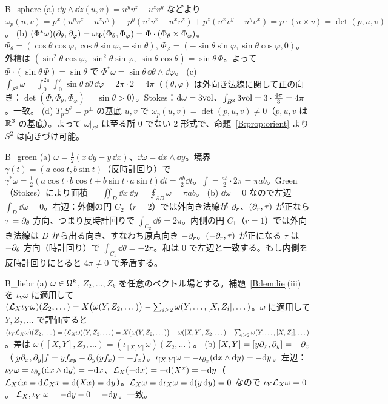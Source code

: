 \begin{soll}{B_sphere}
(a) $\dd y\wedge\dd z(u,v)=u^yv^z-u^zv^y$ などより $\omega_p(u,v)=p^x(u^yv^z-u^zv^y)+p^y(u^zv^x-u^xv^z)+p^z(u^xv^y-u^yv^x)=p\cdot(u\times v)=\det(p,u,v)$。
(b) $(\Phi^*\omega)(\partial_\theta,\partial_\varphi)=\omega_\Phi(\Phi_\theta,\Phi_\varphi)=\Phi\cdot(\Phi_\theta\times\Phi_\varphi)$。$\Phi_\theta=(\cos\theta\cos\varphi,\cos\theta\sin\varphi,-\sin\theta)$, $\Phi_\varphi=(-\sin\theta\sin\varphi,\sin\theta\cos\varphi,0)$。外積は $(\sin^2\theta\cos\varphi,\ \sin^2\theta\sin\varphi,\ \sin\theta\cos\theta)=\sin\theta\,\Phi$。よって $\Phi\cdot(\sin\theta\,\Phi)=\sin\theta$ で $\Phi^*\omega=\sin\theta\,\dd\theta\wedge\dd\varphi$。
(c) $\int_{S^2}\omega=\int_0^{2\pi}\!\!\int_0^\pi\sin\theta\,\dd\theta\,\dd\varphi=2\pi\cdot2=4\pi$（$(\theta,\varphi)$ は外向き法線に関して正の向き：$\det(\Phi,\Phi_\theta,\Phi_\varphi)=\sin\theta>0$）。Stokes：$\mathrm{d}\omega=3\mathrm{vol}$、$\int_{B^3}3\mathrm{vol}=3\cdot\frac{4\pi}{3}=4\pi$。一致。
(d) $T_pS^2=p^\perp$ の基底 $u,v$ で $\omega_p(u,v)=\det(p,u,v)\ne0$（$p,u,v$ は $\mathbb R^3$ の基底）。よって $\omega|_{S^2}$ は至る所 $0$ でない $2$ 形式で、命題~\ref{B:prop:orient} より $S^2$ は向きづけ可能。
\end{soll}

\begin{soll}{B_green}
(a) $\omega=\frac12(x\,\dd y-y\,\dd x)$、$\dd\omega=\dd x\wedge\dd y$。境界 $\gamma(t)=(a\cos t,b\sin t)$（反時計回り）で $\gamma^*\omega=\frac12(a\cos t\cdot b\cos t+b\sin t\cdot a\sin t)\dd t=\frac{ab}2\dd t$。$\int=\frac{ab}2\cdot2\pi=\pi ab$。Green（Stokes）により面積 $=\iint_D\dd x\,\dd y=\oint_{\partial D}\omega=\pi ab$。
(b) $\dd\omega=0$ なので左辺 $\int_D\dd\omega=0$。右辺：外側の円 $C_2$（$r=2$）では外向き法線が $\partial_r$、$(\partial_r,\tau)$ が正なら $\tau=\partial_\theta$ 方向、つまり反時計回りで $\int_{C_2}\dd\theta=2\pi$。内側の円 $C_1$（$r=1$）では外向き法線は $D$ から出る向き、すなわち原点向き $-\partial_r$。$(-\partial_r,\tau)$ が正になる $\tau$ は $-\partial_\theta$ 方向（時計回り）で $\int_{C_1}\dd\theta=-2\pi$。和は $0$ で左辺と一致する。もし内側を反時計回りにとると $4\pi\ne0$ で矛盾する。
\end{soll}

\begin{soll}{B_liebr}
(a) $\omega\in\Omega^k$, $Z_2,\dots,Z_k$ を任意のベクトル場とする。補題~\ref{B:lem:lie}(iii) を $\iota_Y\omega$ に適用して
$(\mathcal L_X\iota_Y\omega)(Z_2,\dots)=X\bigl(\omega(Y,Z_2,\dots)\bigr)-\sum_{i\ge2}\omega(Y,\dots,[X,Z_i],\dots)$。$\omega$ に適用して $Y,Z_2,\dots$ で評価すると
$(\iota_Y\mathcal L_X\omega)(Z_2,\dots)=(\mathcal L_X\omega)(Y,Z_2,\dots)=X\bigl(\omega(Y,Z_2,\dots)\bigr)-\omega([X,Y],Z_2,\dots)-\sum_{i\ge2}\omega(Y,\dots,[X,Z_i],\dots)$。差は $\omega([X,Y],Z_2,\dots)=(\iota_{[X,Y]}\omega)(Z_2,\dots)$。
(b) $[X,Y]=[y\partial_x,\partial_y]=-\partial_x$（$[y\partial_x,\partial_y]f=y f_{xy}-\partial_y(yf_x)=-f_x$）。$\iota_{[X,Y]}\omega=-\iota_{\partial_x}(\mathrm{d} x\wedge\mathrm{d} y)=-\mathrm{d} y$。左辺：$\iota_Y\omega=\iota_{\partial_y}(\mathrm{d} x\wedge\mathrm{d} y)=-\mathrm{d} x$、$\mathcal L_X(-\mathrm{d} x)=-\mathrm{d}(X^x)=-\mathrm{d} y$（$\mathcal L_X\mathrm{d} x=\mathrm{d}\mathcal L_Xx=\mathrm{d}(Xx)=\mathrm{d} y$）。$\mathcal L_X\omega=\mathrm{d}\iota_X\omega=\mathrm{d}(y\,\mathrm{d} y)=0$ なので $\iota_Y\mathcal L_X\omega=0$。$[\mathcal L_X,\iota_Y]\omega=-\mathrm{d} y-0=-\mathrm{d} y$。一致。
\end{soll}

